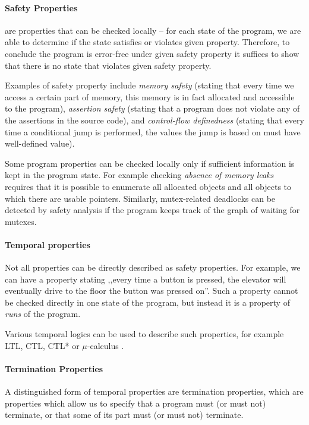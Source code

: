 \paragraph{Safety Properties}
%
are properties that can be checked locally -- for each state of the program, we
are able to determine if the state satisfies or violates given property.
Therefore, to conclude the program is error-free under given safety property it
suffices to show that there is no state that violates given safety property.

Examples of safety property include \emph{memory safety} (stating that every
time we access a certain part of memory, this memory is in fact allocated and
accessible to the program), \emph{assertion safety} (stating that a program
does not violate any of the assertions in the source code), and
\emph{control-flow definedness} (stating that every time a conditional jump is
performed, the values the jump is based on must have well-defined value).

Some program properties can be checked locally only if sufficient information
is kept in the program state.
For example checking \emph{absence of memory leaks} requires that it is
possible to enumerate all allocated objects and all objects to which there are
usable pointers.
Similarly, mutex-related deadlocks can be detected by safety analysis if the program keeps track of the graph of waiting for mutexes.

\paragraph{Temporal properties}
%
Not all properties can be directly described as safety properties.
For example, we can have a property stating ,,every time a button is pressed, the elevator will eventually drive to the floor the button was pressed on''.
Such a property cannot be checked directly in one state of the program, but instead it is a property of \emph{runs} of the program.

Various temporal logics can be used to describe such properties, for example
LTL, CTL, CTL*  or $\mu$-calculus .

\paragraph{Termination Properties}
%
A distinguished form of temporal properties are termination properties, which are properties which allow us to specify that a program must (or must not) terminate, or that some of its part must (or must not) terminate.

